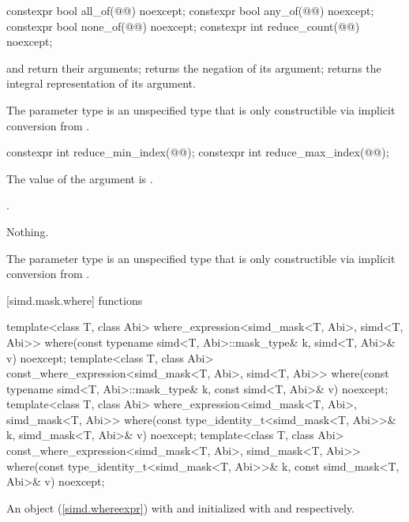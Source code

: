 \begin{itemdecl}
constexpr bool all_of(@@) noexcept;
constexpr bool any_of(@@) noexcept;
constexpr bool none_of(@@) noexcept;
constexpr int reduce_count(@@) noexcept;
\end{itemdecl}

\begin{itemdescr}
  \pnum\returns
   and  return their arguments;  returns the negation of its argument;  returns the integral representation of its argument.

  \pnum\remarks
  The parameter type  is an unspecified type that is only constructible via implicit conversion from .
\end{itemdescr}

\begin{itemdecl}
constexpr int reduce_min_index(@@);
constexpr int reduce_max_index(@@);
\end{itemdecl}

\begin{itemdescr}
  \pnum\requires
  The value of the argument is .

  \pnum\returns
  .

  \pnum\throws Nothing.

  \pnum\remarks
  The parameter type  is an unspecified type that is only constructible via implicit conversion from .
\end{itemdescr}

[simd.mask.where]{ functions}

\begin{itemdecl}
template<class T, class Abi>
  where_expression<simd_mask<T, Abi>, simd<T, Abi>>
    where(const typename simd<T, Abi>::mask_type& k, simd<T, Abi>& v) noexcept;
template<class T, class Abi>
  const_where_expression<simd_mask<T, Abi>, simd<T, Abi>>
    where(const typename simd<T, Abi>::mask_type& k, const simd<T, Abi>& v) noexcept;
template<class T, class Abi>
  where_expression<simd_mask<T, Abi>, simd_mask<T, Abi>>
    where(const type_identity_t<simd_mask<T, Abi>>& k, simd_mask<T, Abi>& v) noexcept;
template<class T, class Abi>
  const_where_expression<simd_mask<T, Abi>, simd_mask<T, Abi>>
    where(const type_identity_t<simd_mask<T, Abi>>& k, const simd_mask<T, Abi>& v) noexcept;
\end{itemdecl}

\begin{itemdescr}
  \pnum\returns
  An object (\ref{simd.whereexpr}) with  and  initialized with  and  respectively.
\end{itemdescr}

